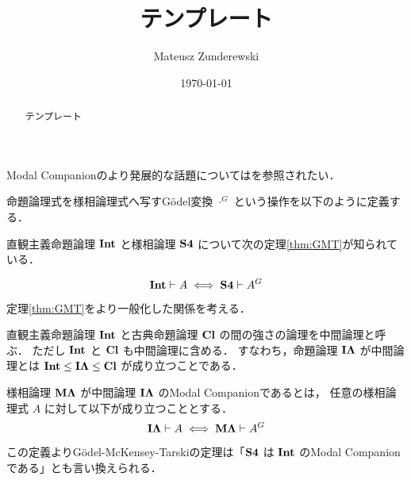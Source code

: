 \documentclass{jlreq}
\title{テンプレート}
\author{Mateusz Zunderewski}
\date{\today}
\begin{document}
\maketitle

\begin{abstract}
	テンプレート
\end{abstract}

\setcounter{tocdepth}{3}
\tableofcontents

\pagebreak

Modal Companionのより発展的な話題については\cite*{chagrov_modal_1992}を参照されたい．

\begin{definition}[Gödel変換]
	命題論理式を様相論理式へ写すGödel変換 $\cdot^G$ という操作を以下のように定義する．
\end{definition}

直観主義命題論理 $\mathbf{Int}$ と様相論理 $\mathbf{S4}$ について次の定理\ref{thm:GMT}が知られている．

\begin{theorem}\label{thm:GMT}
	\begin{equation*}
		\mathbf{Int} \vdash A \iff \mathbf{S4} \vdash A^G
	\end{equation*}
\end{theorem}

定理\ref{thm:GMT}をより一般化した関係を考える．

\begin{definition}[中間論理]
	直観主義命題論理 $\mathbf{Int}$ と古典命題論理 $\mathbf{Cl}$ の間の強さの論理を中間論理と呼ぶ．
	ただし $\mathbf{Int}$ と $\mathbf{Cl}$ も中間論理に含める．
	すなわち，命題論理 $\mathbf{I\Lambda}$ が中間論理とは $\mathbf{Int} \leq \mathbf{I\Lambda} \leq \mathbf{Cl}$ が成り立つことである．
\end{definition}

\begin{definition}
	様相論理 $\mathbf{M\Lambda}$ が中間論理 $\mathbf{I\Lambda}$ のModal Companionであるとは，
	任意の様相論理式 $A$ に対して以下が成り立つこととする．
	\begin{equation*}
		\mathbf{I\Lambda} \vdash A \iff \mathbf{M\Lambda} \vdash A^G
	\end{equation*}
\end{definition}

この定義よりGödel-McKensey-Tarskiの定理は「$\mathbf{S4}$ は $\mathbf{Int}$ のModal Companionである」とも言い換えられる．
\end{document}
